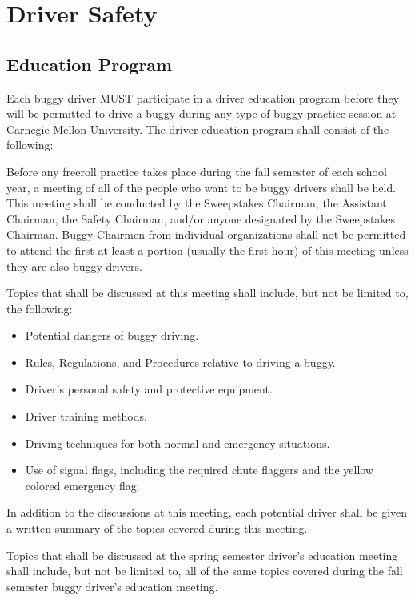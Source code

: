 \section{Driver Safety}

\subsection{Education Program}

	Each buggy driver MUST participate in a driver education program before they
	will be permitted to drive a buggy during any type of buggy practice session at
	Carnegie Mellon University. The driver education program shall consist of the
	following:

	Before any freeroll practice takes place during the fall semester of each
	school year, a meeting of all of the people who want to be buggy drivers shall
	be held. This meeting shall be conducted by the Sweepstakes Chairman, the
	Assistant Chairman, the Safety Chairman, and/or anyone designated by the
	Sweepstakes Chairman. Buggy Chairmen from individual organizations shall not be
	permitted to attend the first at least a portion (usually the first hour) of
	this meeting unless they are also buggy drivers.

	Topics that shall be discussed at this meeting shall include, but not be
	limited to, the following:

	\begin{itemize}
		\item Potential dangers of buggy driving.
		\item Rules, Regulations, and Procedures relative to driving a buggy.
		\item Driver's personal safety and protective equipment.
		\item Driver training methods.
		\item Driving techniques for both normal and emergency situations.
		\item Use of signal flags, including the required chute flaggers and the yellow colored emergency flag. 
	\end{itemize}

	In addition to the discussions at this meeting, each potential driver shall be
	given a written summary of the topics covered during this meeting.

	Topics that shall be discussed at the spring semester driver's education
	meeting shall include, but not be limited to, all of the same topics covered
	during the fall semester buggy driver's education meeting.


